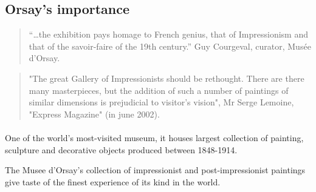 \documentclass[
10pt, %
a4paper, %
oneside, %
headinclude,footinclude, %
BCOR5mm, %
]{scrartcl}
\theoremstyle{definition} %
\theoremstyle{plain} %
\theoremstyle{remark} %
\begin{document}
\subsection{Orsay's importance}

\begin{quote}
“…the exhibition pays homage to French genius, that of Impressionism and that of the savoir-faire of the 19th century.” Guy Courgeval, curator, Musée d’Orsay.
\end{quote}

\begin{quote}
"The great Gallery of Impressionists should be rethought. There are there many masterpieces, but the addition of such a number of paintings of similar dimensions is prejudicial to visitor's vision", Mr Serge Lemoine, "Express Magazine" (in june 2002).
\end{quote}


\paragraph{}

One of the world's most-visited museum, it houses largest collection of painting, sculpture and decorative objects produced between 1848-1914. 

The Musee d'Orsay's collection of impressionist and post-impressionist paintings give taste of the finest experience of its kind in the world.


%
%
%
%
\end{document}
